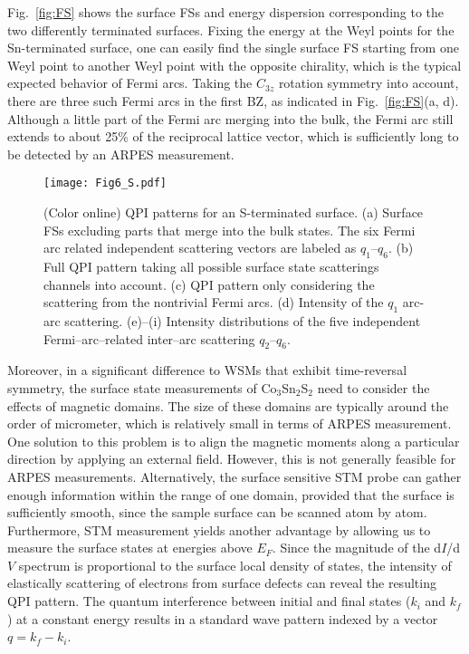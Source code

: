 \documentclass[aps,prb,reprint,superscriptaddress,amssymb,amsmath]{revtex4-1}
\begin{document}
Fig.~\ref{fig:FS} shows the surface FSs and energy dispersion corresponding to the two differently terminated surfaces. 
Fixing the energy at the Weyl points for the Sn-terminated surface, 
one can easily find the single surface FS starting from one Weyl point to another Weyl point with the opposite chirality, 
which is the typical expected behavior of Fermi arcs.
Taking the $C_{3z}$ rotation symmetry into account, there are three such Fermi arcs in the first BZ, as indicated in Fig.~\ref{fig:FS}(a, d). 
Although a little part of the Fermi arc merging into the bulk, the Fermi arc still extends to about 25\% of the reciprocal lattice vector, 
which is sufficiently long to be detected by an ARPES measurement.
  
\begin{figure*}[htb]
\centering
\texttt{[image: Fig6\_S.pdf]}
   \caption{
(Color online) QPI patterns for an S-terminated surface.
(a) Surface FSs excluding parts that merge into the bulk states. The six Fermi arc related independent scattering vectors are labeled as $q_1$--$q_6$.
(b) Full QPI pattern taking all possible surface state scatterings channels into account.
(c) QPI pattern only considering the scattering from the nontrivial Fermi arcs. 
(d) Intensity of the $q_1$ arc-arc scattering.
(e)--(i) Intensity distributions of the five independent Fermi--arc--related inter--arc scattering $q_2$--$q_6$.
}
\label{fig:S}
\end{figure*}

Moreover, in a significant difference to WSMs that exhibit time-reversal symmetry, 
the surface state measurements of Co$_3$Sn$_2$S$_2$ need to consider the effects of magnetic domains. 
The size of these domains are typically around the order of micrometer, which is relatively small in terms of ARPES measurement. 
One solution to this problem is to align the magnetic moments along a particular direction by applying an external field. 
However, this is not generally feasible for ARPES measurements. Alternatively, the surface sensitive STM probe can gather enough information within the range of one domain,
provided that the surface is sufficiently smooth, since the sample surface can be scanned atom by atom. 
Furthermore, STM measurement yields another advantage by allowing us to measure the surface states at energies above $E_F$. 
Since the magnitude of the d$I$/d$V$ spectrum is proportional to the surface local density of states, 
the intensity of elastically scattering of electrons from surface defects can reveal the resulting QPI pattern.
The quantum interference between initial and final states ($k_i$ and $k_f$) at a constant energy results in a standard wave pattern indexed by a vector $q = k_f - k_i$.
\end{document}
